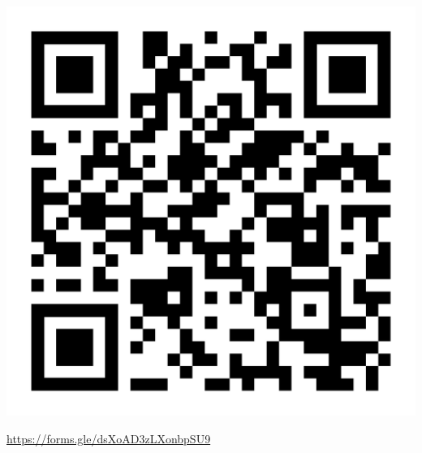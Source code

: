 \documentclass{beamer}
\begin{document}
\begin{frame}
\begin{center}
    \includegraphics[height=0.2\paperheight]{qr-code}\par
    \LARGE\url{https://forms.gle/dsXoAD3zLXonbpSU9}
  \end{center}
\end{frame}
\end{document}
